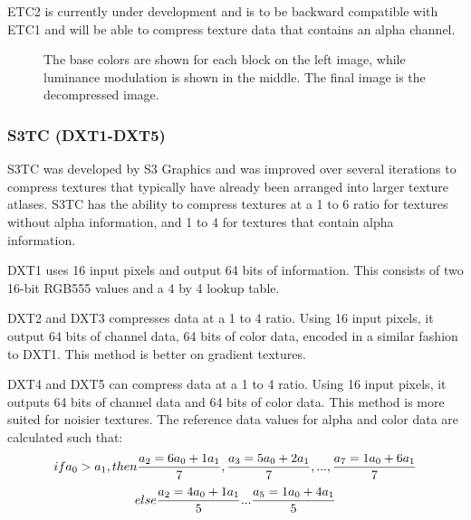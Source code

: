 \documentclass[12pt]{article}
\begin{document}
ETC2 is currently under development and is to be backward compatible with ETC1 and will be able to compress texture data that contains an alpha channel. \citep{Strom2005}

\begin{figure}[!htbp]
\begin{center}
\caption{The base colors are shown for each block on the left image, while luminance modulation is shown in the middle. The final image is the decompressed image.}
\end{center}
\end{figure}

\subsubsection{S3TC (DXT1-DXT5)}
S3TC was developed by S3 Graphics and was improved over several iterations to compress textures that typically have already been arranged into larger texture atlases. S3TC has the ability to compress textures at a 1 to 6 ratio for textures without alpha information, and 1 to 4 for textures that contain alpha information.

DXT1 uses 16 input pixels and output 64 bits of information. This consists of two 16-bit RGB555 values and a 4 by 4 lookup table.

DXT2 and DXT3 compresses data at a 1 to 4 ratio. Using 16 input pixels, it output 64 bits of channel data, 64 bits of color data, encoded in a similar fashion to DXT1. This method is better on gradient textures.

DXT4 and DXT5 can compress data at a 1 to 4 ratio. Using 16 input pixels, it outputs 64 bits of channel data and 64 bits of color data. This method is more suited for noisier textures. The reference data values for alpha and color data are calculated such that:
\[
if a_0 > a_1, then  {a_2 = 6a_0+1a_1\over7},{a_3 = 5a_0+2a_1\over7},... ,{a_7 = 1a_0+6a_1\over7}
\]
\[
else {a_2 = 4a_0+1a_1\over5}...{a_5 = 1a_0+4a_1\over5}
\]
\end{document}
